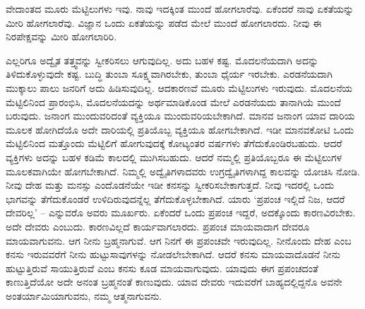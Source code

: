 ವೇದಾಂತದ ಮೂರು ಮೆಟ್ಟಿಲುಗಳು ಇವು. ನಾವು ಇದಕ್ಕಿಂತ ಮುಂದೆ ಹೋಗಲಾರೆವು. ಏಕೆಂದರೆ ನಾವು ಏಕತೆಯನ್ನು ಮೀರಿ ಹೋಗಲಾರೆವು. ವಿಜ್ಞಾನ ಒಂದು ಏಕತೆಯನ್ನು ಪಡೆದ ಮೇಲೆ ಮುಂದೆ ಹೋಗಲಾರದು. ನೀವು ಈ ನಿರಪೇಕ್ಷವನ್ನು ಮೀರಿ ಹೋಗಲಾರಿರಿ.

ಎಲ್ಲರಿಗೂ ಅದ್ವೈತ ತತ್ತ್ವವನ್ನು ಸ್ವೀಕರಿಸಲು ಆಗುವುದಿಲ್ಲ. ಅದು ಬಹಳ ಕಷ್ಟ. ಮೊದಲನೆಯದಾಗಿ ಅದನ್ನು ತಿಳಿದುಕೊಳ್ಳುವುದೇ ಕಷ್ಟ. ಬುದ್ಧಿ ತುಂಬಾ ಸೂಕ್ಷ್ಮವಾಗಿರಬೇಕು, ತುಂಬಾ ಧೈರ್ಯ ಇರಬೇಕು. ಎರಡನೆಯದಾಗಿ ಮುಕ್ಕಾಲು ಪಾಲು ಜನರಿಗೆ ಅದು ಹಿಡಿಸುವುದಿಲ್ಲ. ಆದಕಾರಣವೆ ಮೂರು ಮೆಟ್ಟಿಲುಗಳು ಇರುವುದು. ಮೊದಲನೆಯ ಮೆಟ್ಟಿಲಿನಿಂದ ಪ್ರಾರಂಭಿಸಿ, ಮೊದಲನೆಯದನ್ನು ಅರ್ಥಮಾಡಿಕೊಂಡ ಮೇಲೆ ಎರಡನೆಯದು ತಾನಾಗಿಯೆ ಮುಂದೆ ಬರುವುದು. ಜನಾಂಗ ಮುಂದುವರಿದಂತೆ ವ್ಯಕ್ತಿಯೂ ಮುಂದುವರಿಯಬೇಕಾಗಿದೆ. ಮಾನವ ಜನಾಂಗ ಯಾವ ದಾರಿಯ ಮೂಲಕ ಹೋಗಿದೆಯೊ ಅದೇ ದಾರಿಯಲ್ಲಿ ಪ್ರತಿಯೊಬ್ಬ ವ್ಯಕ್ತಿಯೂ ಹೋಗಬೇಕಾಗಿದೆ. ಇಡೀ ಮಾನವಕೋಟಿ ಒಂದು ಮೆಟ್ಟಿಲಿನಿಂದ ಮತ್ತೊಂದು ಮೆಟ್ಟಿಲಿಗೆ ಹೋಗುವುದಕ್ಕೆ ಕೋಟ್ಯಂತರ ವರ್ಷಗಳು ತೆಗೆದುಕೊಂಡಿರಬಹುದು. ಆದರೆ ವ್ಯಕ್ತಿಗಳು ಅದನ್ನು ಬಹಳ ಕಡಿಮೆ ಕಾಲದಲ್ಲಿ ಮುಗಿಸಬಹುದು. ಆದರೆ ನಮ್ಮಲ್ಲಿ ಪ್ರತಿಯೊಬ್ಬರೂ ಈ ಮೆಟ್ಟಿಲುಗಳ ಮೂಲಕವಾಗಿಯೇ ಹೋಗಬೇಕಾಗಿದೆ. ನಿಮ್ಮಲ್ಲಿ ಅದ್ವೈತಿಗಳಾದವರು ಉಗ್ರದ್ವೈತಿಗಳಾಗಿದ್ದ ಕಾಲವನ್ನು ಯೋಚಿಸಿ ನೋಡಿ. ನೀವು ದೇಹ ಮತ್ತು ಮನಸ್ಸು ಎಂದೊಡನೆಯೇ ಇಡೀ ಕನಸನ್ನು ಸ್ವೀಕರಿಸಬೇಕಾಗುತ್ತದೆ. ನೀವು ಇದರಲ್ಲಿ ಒಂದು ಭಾಗವನ್ನು ತೆಗೆದುಕೊಂಡರೆ ಉಳಿದಿರುವುದನ್ನೆಲ್ಲ ತೆಗೆದುಕೊಳ್ಳಬೇಕಾಗಿದೆ. ಯಾರು ‘ಪ್ರಪಂಚ ಇಲ್ಲಿದೆ ನಿಜ, ಆದರೆ ದೇವರಿಲ್ಲ’ – ಎನ್ನುವರೊ ಅವರು ಮೂರ್ಖರು. ಏಕೆಂದರೆ ಒಂದು ಪ್ರಪಂಚ ಇದ್ದರೆ, ಅದಕ್ಕೊಂದು ಕಾರಣವಿರಬೇಕು. ಅದೇ ದೇವರು ಎಂಬುದು. ಕಾರಣವಿಲ್ಲದೆ ಕಾರ್ಯವಾಗಲಾರದು. ಪ್ರಪಂಚ ಮಾಯವಾದಾಗ ದೇವರೂ ಮಾಯವಾಗುವನು. ಆಗ ನೀನು ಬ್ರಹ್ಮನಾಗುವೆ. ಆಗ ನಿನಗೆ ಈ ಪ್ರಪಂಚವೇ ಇರುವುದಿಲ್ಲ. ನೀನೊಂದು ದೇಹ ಎಂಬ ಕನಸು ಇರುವವರೆಗೆ ನೀನು ಹುಟ್ಟುಸಾವುಗಳನ್ನು ನೋಡಲೇಬೇಕಾಗಿದೆ. ಆದರೆ ಕನಸು ಮಾಯವಾದೊಡನೆ ನೀನು ಹುಟ್ಟುತ್ತಿರುವೆ ಸಾಯುತ್ತಿರುವೆ ಎಂಬ ಕನಸು ಕೂಡ ಮಾಯವಾಗುವುದು. ಯಾವುದು ಈಗ ಪ್ರಪಂಚದಂತೆ ಕಾಣುತ್ತಿದೆಯೋ ಅದೇ ಅನಂತ ಬ್ರಹ್ಮನಂತೆ ಕಾಣುವುದು. ಯಾವ ದೇವರು ಇದುವರೆಗೆ ಬಾಹ್ಯದಲ್ಲಿದ್ದನೊ ಅವನೇ ಅಂತರ್ಯಾಮಿಯಾಗುವನು, ನಮ್ಮ ಆತ್ಮನಾಗುವನು.


